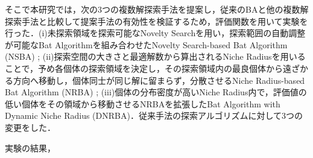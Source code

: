 \documentclass[a4j,11pt]{jarticle}
\begin{document}
そこで本研究では，次の3つの複数解探索手法を提案し，従来のBAと他の複数解探索手法と比較して提案手法の有効性を検証するため，評価関数を用いて実験を行った．(i)未探索領域を探索可能なNovelty Searchを用い，探索範囲の自動調整が可能なBat Algorithmを組み合わせたNovelty Search-based Bat Algorithm (NSBA) \cite{NSBA}; (ii)探索空間の大きさと最適解数から算出されるNiche Radiusを用いることで，予め各個体の探索領域を決定し，その探索領域内の最良個体から遠ざかる方向へ移動し，個体同士が同じ解に留まらず，分散させるNiche Radius-based Bat Algorithm (NRBA) \cite{NRBA}; (iii)個体の分布密度が高いNiche Radius内で，評価値の低い個体をその領域から移動させるNRBAを拡張したBat Algorithm with Dynamic Niche Radius (DNRBA)．従来手法の探索アルゴリズムに対して3つの変更をした．

実験の結果，




\end{document}
